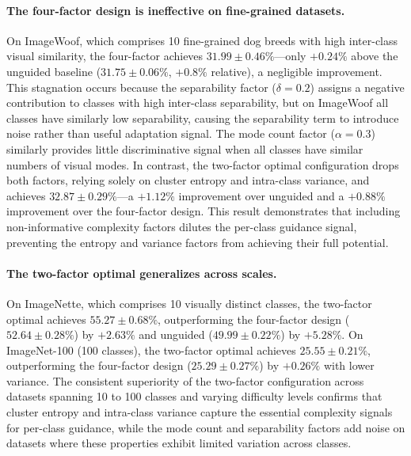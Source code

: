 \paragraph{The four-factor design is ineffective on fine-grained datasets.}
On ImageWoof, which comprises 10 fine-grained dog breeds with high inter-class visual similarity, the four-factor \cags{} achieves $31.99 \pm 0.46\%$---only $+0.24\%$ above the unguided baseline ($31.75 \pm 0.06\%$, $+0.8\%$ relative), a negligible improvement. This stagnation occurs because the separability factor ($\delta{=}0.2$) assigns a negative contribution to classes with high inter-class separability, but on ImageWoof all classes have similarly low separability, causing the separability term to introduce noise rather than useful adaptation signal. The mode count factor ($\alpha{=}0.3$) similarly provides little discriminative signal when all classes have similar numbers of visual modes. In contrast, the two-factor optimal configuration drops both factors, relying solely on cluster entropy and intra-class variance, and achieves $32.87 \pm 0.29\%$---a $+1.12\%$ improvement over unguided and a $+0.88\%$ improvement over the four-factor design. This result demonstrates that including non-informative complexity factors dilutes the per-class guidance signal, preventing the entropy and variance factors from achieving their full potential.

\paragraph{The two-factor optimal generalizes across scales.}
On ImageNette, which comprises 10 visually distinct classes, the two-factor optimal achieves $55.27 \pm 0.68\%$, outperforming the four-factor design ($52.64 \pm 0.28\%$) by $+2.63\%$ and unguided ($49.99 \pm 0.22\%$) by $+5.28\%$. On ImageNet-100 (100 classes), the two-factor optimal achieves $25.55 \pm 0.21\%$, outperforming the four-factor design ($25.29 \pm 0.27\%$) by $+0.26\%$ with lower variance. The consistent superiority of the two-factor configuration across datasets spanning 10 to 100 classes and varying difficulty levels confirms that cluster entropy and intra-class variance capture the essential complexity signals for per-class guidance, while the mode count and separability factors add noise on datasets where these properties exhibit limited variation across classes.

